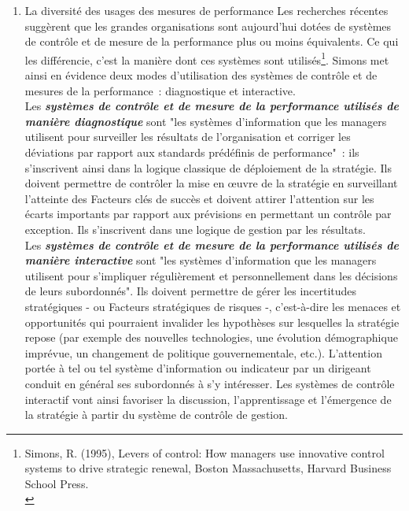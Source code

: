 \documentclass{tufte-handout}
\begin{document}
\begin{enumerate}
\item La diversité des usages des mesures de performance
\label{sec:org63ad023}
Les recherches récentes suggèrent que les grandes organisations sont aujourd'hui dotées de systèmes de contrôle et de mesure de la performance plus ou moins équivalents. Ce qui les différencie, c'est la manière dont ces systèmes sont utilisés\footnote{Simons, R. (1995), Levers of control: How managers use innovative control systems to drive strategic renewal, Boston Massachusetts, Harvard Business School Press.\\}. Simons met ainsi en évidence deux modes d'utilisation des systèmes de contrôle et de mesures de la performance : diagnostique et interactive.\\

Les \emph{\textbf{systèmes de contrôle et de mesure de la performance utilisés de manière diagnostique}} sont "les systèmes d'information que les managers utilisent pour surveiller les résultats de l'organisation et corriger les déviations par rapport aux standards prédéfinis de performance" : ils s'inscrivent ainsi dans la logique classique de déploiement de la stratégie. Ils doivent permettre de contrôler la mise en œuvre de la stratégie en surveillant l'atteinte des Facteurs clés de succès et doivent attirer l'attention sur les écarts importants par rapport aux prévisions en permettant un contrôle par exception. Ils s'inscrivent dans une logique de gestion par les résultats.\\

Les \emph{\textbf{systèmes de contrôle et de mesure de la performance utilisés de manière interactive}} sont "les systèmes d'information que les managers utilisent pour s'impliquer régulièrement et personnellement dans les décisions de leurs subordonnés". Ils doivent permettre de gérer les incertitudes stratégiques - ou Facteurs stratégiques de risques -, c'est-à-dire les menaces et opportunités qui pourraient invalider les hypothèses sur lesquelles la stratégie repose (par exemple des nouvelles technologies, une évolution démographique imprévue, un changement de politique gouvernementale, etc.). L'attention portée à tel ou tel système d'information ou indicateur par un dirigeant conduit en général ses subordonnés à s'y intéresser. Les systèmes de contrôle interactif vont ainsi favoriser la discussion, l'apprentissage et l'émergence de la stratégie à partir du système de contrôle de gestion.\\


\end{enumerate}
\end{document}
